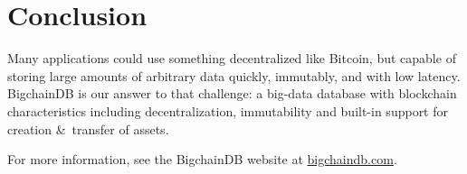 \documentclass[a4paper]{article}
\begin{document}
\section{Conclusion}

Many applications could use something decentralized like Bitcoin,
but capable of storing large amounts of arbitrary data quickly,
immutably, and with low latency.
BigchainDB is our answer to that challenge:
a big-data database with blockchain characteristics
including decentralization, immutability and
built-in support for creation \&~transfer of assets.

For more information, see the BigchainDB website
at \href{https://www.bigchaindb.com/}{bigchaindb.com}.



\end{document}
